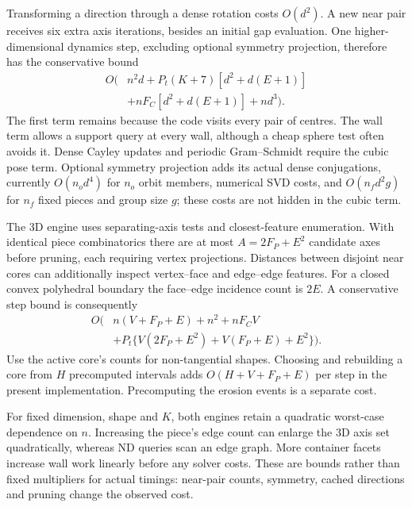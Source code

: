 \documentclass[11pt,a4paper]{article}
\begin{document}
Transforming a direction through a dense rotation costs $O(d^2)$. A new near pair receives six extra axis iterations, besides an initial gap evaluation. One higher-dimensional dynamics step, excluding optional symmetry projection, therefore has the conservative bound
\begin{equation}\label{eq:ndcost}
\begin{aligned}
O\!\bigl(&n^2d+P_t(K+7)[d^2+d(E+1)]\\
 &+nF_C[d^2+d(E+1)]+nd^3\bigr).
\end{aligned}
\end{equation}
The first term remains because the code visits every pair of centres. The wall term allows a support query at every wall, although a cheap sphere test often avoids it. Dense Cayley updates and periodic Gram--Schmidt require the cubic pose term. Optional symmetry projection adds its actual dense conjugations, currently $O(n_od^4)$ for $n_o$ orbit members, numerical SVD costs, and $O(n_fd^2g)$ for $n_f$ fixed pieces and group size $g$; these costs are not hidden in the cubic term.

The 3D engine uses separating-axis tests and closest-feature enumeration. With identical piece combinatorics there are at most $A=2F_P+E^2$ candidate axes before pruning, each requiring vertex projections. Distances between disjoint near cores can additionally inspect vertex--face and edge--edge features. For a closed convex polyhedral boundary the face--edge incidence count is $2E$. A conservative step bound is consequently
\begin{equation}\label{eq:3dcost}
\begin{aligned}
O\!\bigl(&n(V+F_P+E)+n^2+nF_CV\\
 &+P_t\{V(2F_P+E^2)+V(F_P+E)+E^2\}\bigr).
\end{aligned}
\end{equation}
Use the active core's counts for non-tangential shapes. Choosing and rebuilding a core from $H$ precomputed intervals adds $O(H+V+F_P+E)$ per step in the present implementation. Precomputing the erosion events is a separate cost.

For fixed dimension, shape and $K$, both engines retain a quadratic worst-case dependence on $n$. Increasing the piece's edge count can enlarge the 3D axis set quadratically, whereas ND queries scan an edge graph. More container facets increase wall work linearly before any solver costs. These are bounds rather than fixed multipliers for actual timings: near-pair counts, symmetry, cached directions and pruning change the observed cost.
\end{document}
